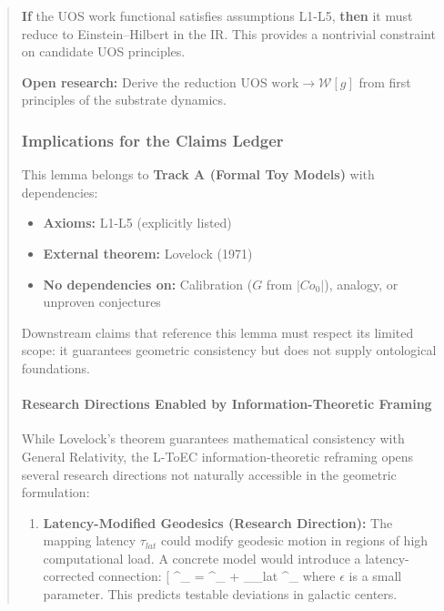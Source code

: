 \documentclass[11pt,titlepage]{article}
\begin{document}
\begin{abstract}
\begin{tcolorbox}[colback=blue!5!white,colframe=blue!75!black,title=Consistency Check Passed]
\textbf{If} the UOS work functional satisfies assumptions L1-L5, \textbf{then} it must reduce to Einstein--Hilbert in the IR. This provides a nontrivial constraint on candidate UOS principles.

\textbf{Open research:} Derive the reduction $\text{UOS work} \to \mathcal{W}[g]$ from first principles of the substrate dynamics.
\end{tcolorbox}

\subsubsection{Implications for the Claims Ledger}
This lemma belongs to \textbf{Track A (Formal Toy Models)} with dependencies:
\begin{itemize}
\item \textbf{Axioms:} L1-L5 (explicitly listed)
\item \textbf{External theorem:} Lovelock (1971)
\item \textbf{No dependencies on:} Calibration ($G$ from $|Co_0|$), analogy, or unproven conjectures
\end{itemize}

Downstream claims that reference this lemma must respect its limited scope: it guarantees geometric consistency but does not supply ontological foundations.


\paragraph{Research Directions Enabled by Information-Theoretic Framing}
While Lovelock's theorem guarantees mathematical consistency with General Relativity, the L-ToEC information-theoretic reframing opens several research directions not naturally accessible in the geometric formulation:

\begin{enumerate}
    \item \textbf{Latency-Modified Geodesics (Research Direction):} The mapping latency $\tau_{lat}$ could modify geodesic motion in regions of high computational load. A concrete model would introduce a latency-corrected connection:
    [
    \tilde{\Gamma}^\alpha_{\beta\gamma} = \Gamma^\alpha_{\beta\gamma} + \epsilon \nabla_\beta \tau_{lat} \delta^\alpha_\gamma
    \]
    where $\epsilon$ is a small parameter. This predicts testable deviations in galactic centers.
    

\end{enumerate}
\end{abstract}
\end{document}
